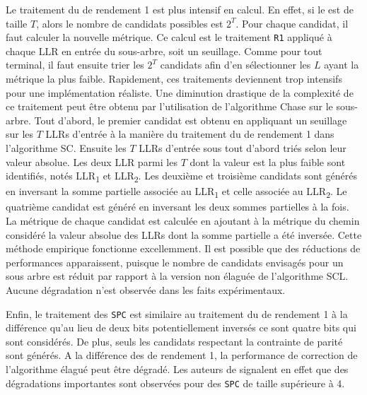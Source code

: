 Le traitement du \noeud de rendement 1 est plus intensif en calcul. En effet, si le \noeud est de taille $T$, alors le nombre de candidats possibles est $2^T$. Pour chaque candidat, il faut calculer la nouvelle métrique. Ce calcul est le traitement \texttt{R1} appliqué à chaque LLR en entrée du sous-arbre, soit un seuillage. Comme pour tout \noeud terminal, il faut ensuite trier les $2^T$ candidats afin d'en sélectionner les $L$ ayant la métrique la plus faible. Rapidement, ces traitements deviennent trop intensifs pour une implémentation réaliste. Une diminution drastique de la complexité de ce traitement peut être obtenu par l'utilisation de l'algorithme \og Chase \fg sur le sous-arbre. Tout d'abord, le premier candidat est obtenu en appliquant un seuillage sur les $T$ LLRs d'entrée à la manière du traitement du \noeud de rendement 1 dans l'algorithme SC. Ensuite les $T$ LLRs d'entrée sous tout d'abord triés selon leur valeur absolue. Les deux LLR parmi les $T$  dont la valeur est la plus faible sont identifiés, notés LLR\textsubscript{1} et LLR\textsubscript{2}. Les deuxième et troisième candidats sont générés en inversant la somme partielle associée au LLR\textsubscript{1} et celle associée au LLR\textsubscript{2}. Le quatrième candidat est généré en inversant les deux sommes partielles à la fois. La métrique de chaque candidat est calculée en ajoutant à la métrique du chemin considéré la valeur absolue des LLRs dont la somme partielle a été inversée. Cette méthode empirique fonctionne excellemment. Il est possible que des réductions de performances apparaissent, puisque le nombre de candidats envisagés pour un sous arbre est réduit par rapport à la version non élaguée de l'algorithme SCL. Aucune dégradation n'est observée dans les faits expérimentaux.
 

Enfin, le traitement des \noeuds \texttt{SPC} est similaire au traitement du \noeud de rendement 1 à la différence qu'au lieu de deux bits potentiellement inversés ce sont quatre bits qui sont considérés. De plus, seuls les candidats respectant la contrainte de parité sont générés. A la différence des \noeuds de rendement 1, la performance de correction de l'algorithme élagué peut être dégradé. Les auteurs de \cite{sarkis_fast_2016} signalent en effet que des dégradations importantes sont observées pour des \noeuds \texttt{SPC} de taille supérieure à 4. 


